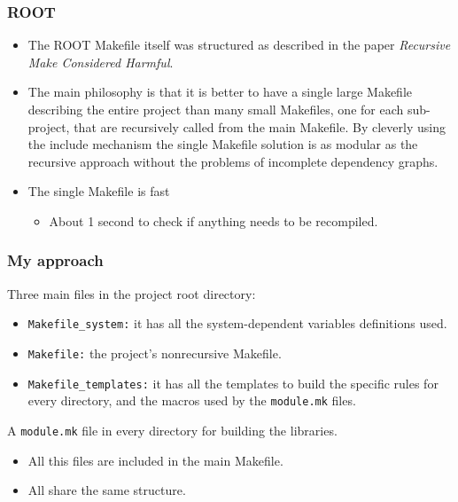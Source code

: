 \documentclass[11pt]{beamer}
\begin{document}

\begin{frame}
  \frametitle{ROOT}
  \begin{itemize}
    \item The ROOT Makefile itself was structured as described in the paper
      \emph{Recursive Make Considered Harmful}.\\[5mm]
    \item The main philosophy is that it is better to have a single large
      Makefile describing the entire project than many small Makefiles, one
      for each sub-project, that are recursively called from the main
      Makefile. By cleverly using the include mechanism the single Makefile
      solution is as modular as the recursive approach without the problems of
      incomplete dependency graphs.\\[5mm]
    \item The single Makefile is fast
      \begin{itemize}
        \item About 1 second to check if anything needs to be recompiled.
      \end{itemize}
  \end{itemize}
\end{frame}


\begin{frame}
  \frametitle{My approach}
  Three main files in the project root directory:

  \begin{itemize}
    \item \texttt{Makefile\_system:} it has all the system-dependent variables
      definitions used.\\[2mm]
    \item \texttt{Makefile:} the project's nonrecursive Makefile.\\[2mm]
    \item \texttt{Makefile\_templates:} it has all the templates to build the
      specific rules for every directory, and the macros used by the
      \texttt{module.mk} files. 
  \end{itemize}

  \vspace{3mm}
  A \texttt{module.mk} file in every directory for building the libraries.

  \begin{itemize}
    \item All this files are included in the main Makefile.\\[2mm]
    \item All share the same structure.
  \end{itemize}
\end{frame}
\end{document}
